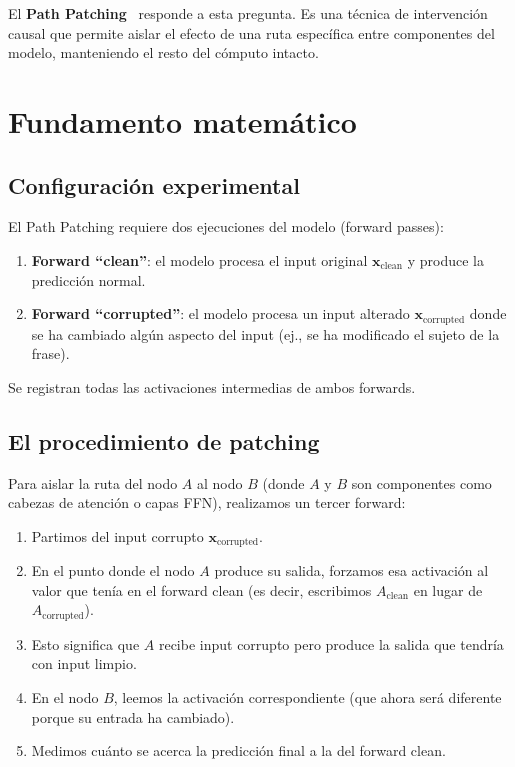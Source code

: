 \documentclass[11pt,a4paper]{report}
\theoremstyle{definition}
\begin{document}
El \textbf{Path Patching}~\cite{wang2022ioi,goldowsky2023pathpatching} responde a esta pregunta. Es una técnica de intervención causal que permite aislar el efecto de una ruta específica entre componentes del modelo, manteniendo el resto del cómputo intacto.

\section{Fundamento matemático}

\subsection{Configuración experimental}

El Path Patching requiere dos ejecuciones del modelo (forward passes):

\begin{enumerate}
    \item \textbf{Forward ``clean''}: el modelo procesa el input original $\mathbf{x}_{\text{clean}}$ y produce la predicción normal.
    \item \textbf{Forward ``corrupted''}: el modelo procesa un input alterado $\mathbf{x}_{\text{corrupted}}$ donde se ha cambiado algún aspecto del input (ej., se ha modificado el sujeto de la frase).
\end{enumerate}

Se registran todas las activaciones intermedias de ambos forwards.

\subsection{El procedimiento de patching}

Para aislar la ruta del nodo $A$ al nodo $B$ (donde $A$ y $B$ son componentes como cabezas de atención o capas FFN), realizamos un tercer forward:

\begin{enumerate}
    \item Partimos del input corrupto $\mathbf{x}_{\text{corrupted}}$.
    \item En el punto donde el nodo $A$ produce su salida, forzamos esa activación al valor que tenía en el forward clean (es decir, escribimos $A_{\text{clean}}$ en lugar de $A_{\text{corrupted}}$).
    \item Esto significa que $A$ recibe input corrupto pero produce la salida que tendría con input limpio.
    \item En el nodo $B$, leemos la activación correspondiente (que ahora será diferente porque su entrada ha cambiado).
    \item Medimos cuánto se acerca la predicción final a la del forward clean.
\end{enumerate}
\end{document}
